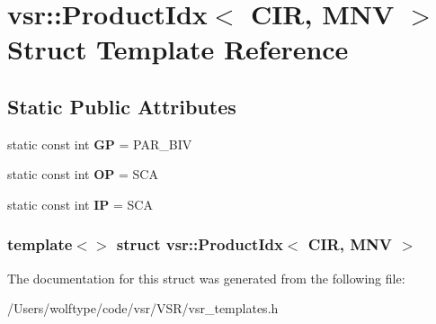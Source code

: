 \hypertarget{structvsr_1_1_product_idx_3_01_c_i_r_00_01_m_n_v_01_4}{\section{vsr\-:\-:Product\-Idx$<$ C\-I\-R, M\-N\-V $>$ Struct Template Reference}
\label{structvsr_1_1_product_idx_3_01_c_i_r_00_01_m_n_v_01_4}
}
\subsection*{Static Public Attributes}
\begin{DoxyCompactItemize}
\item 
\hypertarget{structvsr_1_1_product_idx_3_01_c_i_r_00_01_m_n_v_01_4_aa8af3f5f926e23bce0f1c1c865f3e81d}{static const int {\bfseries G\-P} = P\-A\-R\-\_\-\-B\-I\-V}\label{structvsr_1_1_product_idx_3_01_c_i_r_00_01_m_n_v_01_4_aa8af3f5f926e23bce0f1c1c865f3e81d}

\item 
\hypertarget{structvsr_1_1_product_idx_3_01_c_i_r_00_01_m_n_v_01_4_a36427baaeda1d6f174299cd5a4ede67f}{static const int {\bfseries O\-P} = S\-C\-A}\label{structvsr_1_1_product_idx_3_01_c_i_r_00_01_m_n_v_01_4_a36427baaeda1d6f174299cd5a4ede67f}

\item 
\hypertarget{structvsr_1_1_product_idx_3_01_c_i_r_00_01_m_n_v_01_4_a291bbf70a0cc5e6744aebfbac9fbf392}{static const int {\bfseries I\-P} = S\-C\-A}\label{structvsr_1_1_product_idx_3_01_c_i_r_00_01_m_n_v_01_4_a291bbf70a0cc5e6744aebfbac9fbf392}

\end{DoxyCompactItemize}
\subsubsection*{template$<$$>$ struct vsr\-::\-Product\-Idx$<$ C\-I\-R, M\-N\-V $>$}



The documentation for this struct was generated from the following file\-:\begin{DoxyCompactItemize}
\item 
/\-Users/wolftype/code/vsr/\-V\-S\-R/vsr\-\_\-templates.\-h\end{DoxyCompactItemize}
